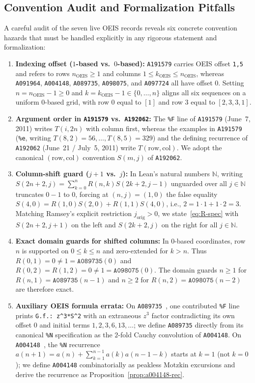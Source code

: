 \documentclass[11pt]{article}
\theoremstyle{definition}
\newcommand{\N}{\mathbb{N}}
\newcommand{\seq}[1]{\texttt{#1}}
\begin{document}
\subsection{Convention Audit and Formalization Pitfalls}
\label{sec:conventions}

A careful audit of the seven live OEIS records reveals six concrete convention hazards that must be handled explicitly in any rigorous statement and formalization:
\begin{enumerate}
\item \textbf{Indexing offset ($1$-based vs.\ $0$-based):} \seq{A191579} carries OEIS offset \texttt{1,5} and refers to rows $n_{\mathrm{OEIS}} \ge 1$ and columns $1 \le k_{\mathrm{OEIS}} \le n_{\mathrm{OEIS}}$, whereas \seq{A091964}, \seq{A004148}, \seq{A089735}, \seq{A098075}, and \seq{A097724} all have offset $0$. Setting $n = n_{\mathrm{OEIS}} - 1 \ge 0$ and $k = k_{\mathrm{OEIS}} - 1 \in \{0, \dots, n\}$ aligns all six sequences on a uniform $0$-based grid, with row $0$ equal to $[1]$ and row $3$ equal to $[2, 3, 3, 1]$.
\item \textbf{Argument order in \seq{A191579} vs.\ \seq{A192062}:} The \texttt{\%F} line of \seq{A191579} (June~7, 2011) writes $T(i, 2n)$ with column first, whereas the examples in \seq{A191579} (\texttt{\%e}, writing $T(8, 2) = 56, \dots, T(8, 5) = 329$) and the defining recurrence of \seq{A192062} (June~21 / July~5, 2011) write $T(\text{row}, \text{col})$. We adopt the canonical $(\text{row}, \text{col})$ convention $S(m, j)$ of \seq{A192062}.
\item \textbf{Column-shift guard ($j + 1$ vs.\ $j$):} In Lean's natural numbers $\N$, writing $S(2n+2, j) = \sum_{k=0}^n R(n,k) S(2k+2, j - 1)$ unguarded over all $j \in \N$ truncates $0 - 1$ to $0$, forcing at $(n, j) = (1, 0)$ the false equality $S(4, 0) = R(1, 0) S(2, 0) + R(1, 1) S(4, 0)$, i.e., $2 = 1 \cdot 1 + 1 \cdot 2 = 3$. Matching Ramsey's explicit restriction $j_{\mathrm{orig}} > 0$, we state~\eqref{eq:R-spec} with $S(2n+2, j+1)$ on the left and $S(2k+2, j)$ on the right for all $j \in \N$.
\item \textbf{Exact domain guards for shifted columns:} In $0$-based coordinates, row $n$ is supported on $0 \le k \le n$ and zero-extended for $k > n$. Thus $R(0, 1) = 0 \ne 1 = \seq{A089735}(0)$ and $R(0, 2) = R(1, 2) = 0 \ne 1 = \seq{A098075}(0)$. The domain guards $n \ge 1$ for $R(n, 1) = \seq{A089735}(n - 1)$ and $n \ge 2$ for $R(n, 2) = \seq{A098075}(n - 2)$ are therefore exact.
\item \textbf{Auxiliary OEIS formula errata:} On \seq{A089735}~\cite{oeis089735}, one contributed \texttt{\%F} line prints \texttt{G.f.: z\textasciicircum 3*S\textasciicircum 2} with an extraneous $z^3$ factor contradicting its own offset $0$ and initial terms $1, 2, 3, 6, 13, \dots$; we define \seq{A089735} directly from its canonical \texttt{\%N} specification as the $2$-fold Cauchy convolution of \seq{A004148}. On \seq{A004148}~\cite{oeis004148}, the \texttt{\%N} recurrence $a(n+1) = a(n) + \sum_{k=1}^{n-1} a(k) a(n-1-k)$ starts at $k = 1$ (not $k = 0$); we define \seq{A004148} combinatorially as peakless Motzkin excursions and derive the recurrence as Proposition~\ref{prop:a004148-rec}.

\end{enumerate}
\end{document}
